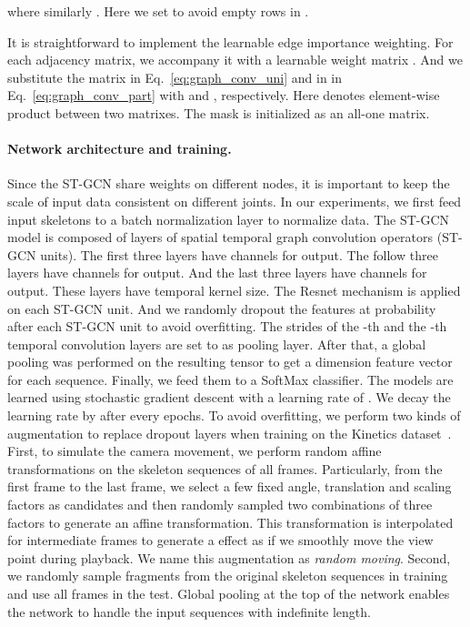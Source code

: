 \documentclass[letterpaper]{article} \usepackage{aaai18}  \usepackage{times}  \usepackage{helvet}  \usepackage{courier}  \usepackage{url}  \usepackage{graphicx}
\begin{document}
where similarly . 
Here we set  to avoid empty rows in .

It is straightforward to implement the learnable edge importance weighting. 
For each adjacency matrix, we accompany it with a learnable weight matrix .
And we substitute the matrix  in Eq.~\ref{eq:graph_conv_uni} and  in  in Eq.~\ref{eq:graph_conv_part} with  and , respectively. 
Here  denotes element-wise product between two matrixes.
The mask  is initialized as an all-one matrix. 

\paragraph{Network architecture and training.}
Since the ST-GCN share weights on different nodes, it is important to keep the scale of input data consistent on different joints. 
In our experiments, we first feed input skeletons to a batch normalization layer to normalize data.   
The ST-GCN model is composed of  layers of spatial temporal graph convolution operators (ST-GCN units). 
The first three layers have  channels for output. 
The follow three layers have  channels for output.
And the last three layers have  channels for output.
These layers have  temporal kernel size.
The Resnet mechanism is applied on each ST-GCN unit.
And we randomly dropout the features at  probability after each ST-GCN unit to avoid overfitting. 
The strides of the -th and the -th temporal convolution layers are set to  as
pooling layer.
After that, a global pooling was performed on the resulting tensor to get a  dimension feature vector for each sequence. 
Finally, we feed them to a SoftMax classifier.
The models are learned using stochastic gradient descent with a learning rate of . We decay the learning rate by  after every  epochs.
To avoid overfitting, we perform two kinds of augmentation to replace dropout layers when training on the Kinetics dataset~\cite{Kay2017Kinetics}.
First, to simulate the camera movement, we perform random affine transformations on the skeleton sequences of all frames. 
Particularly, from  the first frame to the last frame, we select a few fixed angle, translation and scaling factors as candidates 
and then randomly
sampled two combinations of three factors to generate an affine transformation. 
This transformation is interpolated for intermediate frames to generate a effect as if we smoothly move the view point during playback.
We name this augmentation as \emph{random moving}.
Second, we randomly sample fragments from the original skeleton sequences in training and use all frames in the test. 
Global pooling at the top of the network enables the network to handle the input sequences with indefinite length.
\end{document}
